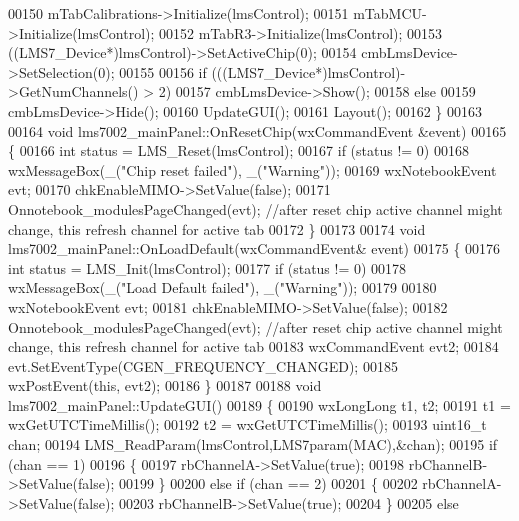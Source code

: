 \begin{DoxyCode}
00150     mTabCalibrations->Initialize(lmsControl);
00151     mTabMCU->Initialize(lmsControl);
00152     mTabR3->Initialize(lmsControl);
00153     ((LMS7_Device*)lmsControl)->SetActiveChip(0);
00154     cmbLmsDevice->SetSelection(0);
00155 
00156     \textcolor{keywordflow}{if} (((LMS7_Device*)lmsControl)->GetNumChannels() > 2)
00157         cmbLmsDevice->Show();
00158     \textcolor{keywordflow}{else}
00159         cmbLmsDevice->Hide();
00160     UpdateGUI();
00161     Layout();
00162 \}
00163 
00164 \textcolor{keywordtype}{void} lms7002_mainPanel::OnResetChip(wxCommandEvent &event)
00165 \{
00166     \textcolor{keywordtype}{int} status = LMS_Reset(lmsControl);
00167     \textcolor{keywordflow}{if} (status != 0)
00168         wxMessageBox(\_(\textcolor{stringliteral}{"Chip reset failed"}), \_(\textcolor{stringliteral}{"Warning"}));
00169     wxNotebookEvent evt;
00170     chkEnableMIMO->SetValue(\textcolor{keyword}{false});
00171     Onnotebook_modulesPageChanged(evt); \textcolor{comment}{//after reset chip active channel might change, this refresh
       channel for active tab}
00172 \}
00173 
00174 \textcolor{keywordtype}{void} lms7002_mainPanel::OnLoadDefault(wxCommandEvent& event)
00175 \{
00176     \textcolor{keywordtype}{int} status = LMS_Init(lmsControl);
00177     \textcolor{keywordflow}{if} (status != 0)
00178         wxMessageBox(\_(\textcolor{stringliteral}{"Load Default failed"}), \_(\textcolor{stringliteral}{"Warning"}));
00179 
00180     wxNotebookEvent evt;
00181     chkEnableMIMO->SetValue(\textcolor{keyword}{false});
00182     Onnotebook_modulesPageChanged(evt); \textcolor{comment}{//after reset chip active channel might change, this refresh
       channel for active tab}
00183     wxCommandEvent evt2;
00184     evt.SetEventType(CGEN\_FREQUENCY\_CHANGED);
00185     wxPostEvent(\textcolor{keyword}{this}, evt2);
00186 \}
00187 
00188 \textcolor{keywordtype}{void} lms7002_mainPanel::UpdateGUI()
00189 \{
00190     wxLongLong t1, t2;
00191     t1 = wxGetUTCTimeMillis();
00192     t2 = wxGetUTCTimeMillis();
00193     uint16\_t chan;
00194     LMS_ReadParam(lmsControl,LMS7param(MAC),&chan);
00195     \textcolor{keywordflow}{if} (chan == 1)
00196     \{
00197         rbChannelA->SetValue(\textcolor{keyword}{true});
00198         rbChannelB->SetValue(\textcolor{keyword}{false});
00199     \}
00200     \textcolor{keywordflow}{else} \textcolor{keywordflow}{if} (chan == 2)
00201     \{
00202         rbChannelA->SetValue(\textcolor{keyword}{false});
00203         rbChannelB->SetValue(\textcolor{keyword}{true});
00204     \}
00205     \textcolor{keywordflow}{else}

\end{DoxyCode}
